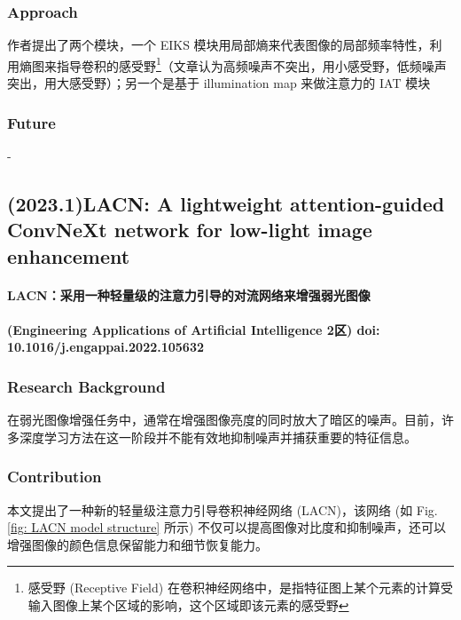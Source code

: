 \documentclass[a4paper]{ctexart}
\begin{document}
	\subsubsection{Approach}
	
	作者提出了两个模块，一个 EIKS 模块用局部熵来代表图像的局部频率特性，利用熵图来指导卷积的感受野\footnote{感受野 (Receptive Field) 在卷积神经网络中，是指特征图上某个元素的计算受输入图像上某个区域的影响，这个区域即该元素的感受野}（文章认为高频噪声不突出，用小感受野，低频噪声突出，用大感受野）；另一个是基于 illumination map 来做注意力的 IAT 模块
	
	\subsubsection{Future}
	
	-
	
	\subsection{(2023.1)LACN: A lightweight attention-guided ConvNeXt network for low-light image enhancement}
	
	\paragraph{LACN：采用一种轻量级的注意力引导的对流网络来增强弱光图像}
	
	\paragraph{(Engineering Applications of Artificial Intelligence 2区) doi: 10.1016/j.engappai.2022.105632}
	
	\subsubsection{Research Background}
	
	在弱光图像增强任务中，通常在增强图像亮度的同时放大了暗区的噪声。目前，许多深度学习方法在这一阶段并不能有效地抑制噪声并捕获重要的特征信息。
	
	\subsubsection{Contribution}
	
	本文提出了一种新的轻量级注意力引导卷积神经网络 (LACN)，该网络 (如 Fig. \ref{fig: LACN model structure} 所示) 不仅可以提高图像对比度和抑制噪声，还可以增强图像的颜色信息保留能力和细节恢复能力。
	
\end{document}
